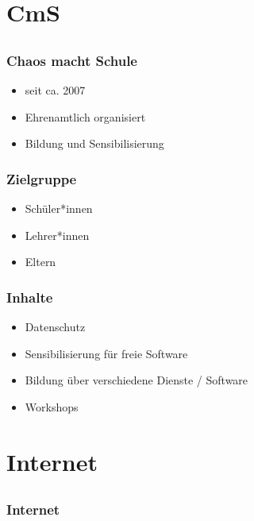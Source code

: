 \documentclass[12pt, table]{beamer}
\begin{document}
\section{CmS}
  \subsection{}
  
  \begin{frame}
    \frametitle{Chaos macht Schule}
    \begin{itemize}
      \item seit ca. 2007
      \item Ehrenamtlich organisiert
      \item Bildung und Sensibilisierung
    \end{itemize}
  \end{frame}
  
  \begin{frame}
    \frametitle{Zielgruppe}
    \begin{itemize}
      \item Schüler*innen
      \item Lehrer*innen
      \item Eltern 
    \end{itemize}
  \end{frame}
  
  \begin{frame}
    \frametitle{Inhalte}
    \begin{itemize}
      \item Datenschutz
      \item Sensibilisierung für freie Software
      \item Bildung über verschiedene Dienste / Software
      \item Workshops
    \end{itemize}
  \end{frame}
  
\section{Internet}
  \subsection{}
  
  \begin{frame}
    \frametitle{Internet}
    \begin{center}
    \end{center}
  \end{frame}
  
\end{document}
